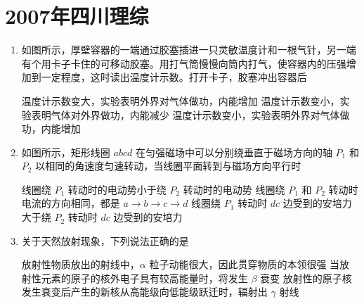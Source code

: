 \documentclass[\gkver]{gaokaozhenti}
\begin{document}
\chapter{2007年四川理综}

\begin{enumerate}
\item
如图所示，厚壁容器的一端通过胶塞插进一只灵敏温度计和一根气针，另一端有个用卡子卡住的可移动胶塞。用打气筒慢慢向筒内打气，使容器内的压强增加到一定程度，这时读出温度计示数。打开卡子，胶塞冲出容器后


{温度计示数变大，实验表明外界对气体做功，内能增加}
{温度计示数变小，实验表明气体对外界做功，内能减少}
{温度计示数变小，实验表明外界对气体做功，内能增加}


\item
如图所示，矩形线圈 $abcd$ 在匀强磁场中可以分别绕垂直于磁场方向的轴 $P_{1}$ 和 $P_{2}$ 以相同的角速度匀速转动，当线圈平面转到与磁场方向平行时


{线圈绕 $P_{1}$ 转动时的电动势小于绕 $P_{2}$ 转动时的电动势}
{线圈绕 $P_{1}$ 和 $P_{2}$ 转动时电流的方向相同，都是 $a\to b\to c\to d$}
{线圈绕 $P_{1}$ 转动时 $dc$ 边受到的安培力大于绕 $P_{2}$ 转动时 $dc$ 边受到的安培力}


\item
关于天然放射现象，下列说法正确的是

{放射性物质放出的射线中，$\alpha$ 粒子动能很大，因此贯穿物质的本领很强}
{当放射性元素的原子的核外电子具有较高能量时，将发生 $\beta$ 衰变}
{放射性的原子核发生衰变后产生的新核从高能级向低能级跃迁时，辐射出 $\gamma$ 射线}


\end{enumerate}
\end{document}
